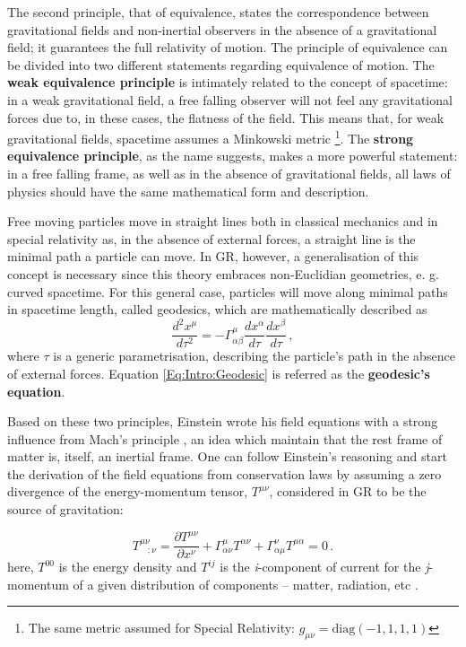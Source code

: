 \qquad The second principle, that of equivalence, states the correspondence between gravitational fields and non-inertial observers in the absence of a gravitational field; it guarantees the full relativity of motion. The principle of equivalence can be divided into two different statements regarding equivalence of motion. The \textbf{weak equivalence principle} is intimately related to the concept of spacetime: in a weak gravitational field, a free falling observer will not feel any gravitational forces due to, in these cases, the flatness of the field. This means that, for weak gravitational fields, spacetime assumes a Minkowski metric \footnote{ The same metric assumed for Special Relativity: $g_{\mu\nu} = \text{diag}(-1,1,1,1)$}. The \textbf{strong equivalence principle}, as the name suggests, makes a more powerful statement: in a free falling frame, as well as in the absence of gravitational fields, all laws of physics should have the same mathematical form and description.

\qquad Free moving particles move in straight lines both in classical mechanics and in special relativity as, in the absence of external forces, a straight line is the minimal path  a particle can move. In GR, however, a generalisation of this concept is necessary since this theory embraces non-Euclidian geometries, e. g. curved spacetime. For this general case, particles will move along minimal paths in spacetime length, called geodesics, which are mathematically described as
\begin{equation}
\frac{d^2x^{\mu}}{d\tau^2} = -\Gamma_{\alpha\beta}^{\mu}\frac{dx^{\alpha}}{d\tau}\frac{dx^{\beta}}{d\tau}\, ,
\label{Eq:Intro:Geodesic}
\end{equation}
where $\tau$ is a generic parametrisation, describing the particle's path in the absence of external forces. Equation \eqref{Eq:Intro:Geodesic} is referred as the \textbf{geodesic's equation}.

\qquad Based on these two principles, Einstein wrote his field equations with a strong influence from Mach's principle \citep{1961BransDickeMach}, an idea which maintain that the rest frame of matter is, itself, an inertial frame. One can follow Einstein's reasoning and start the derivation of the field equations from conservation laws by assuming a zero divergence of the energy-momentum tensor, $T^{\mu\nu}$, considered in GR to be the source of gravitation:

\begin{equation}
T^{\mu\nu}_{\ \ \ \ ;\nu}  = \frac{\partial T^{\mu\nu}}{\partial x^{\nu}} + \Gamma^{\mu}_{\alpha\nu}T^{\alpha\nu} + \Gamma^{\nu}_{\alpha\mu}T^{\mu\alpha}=0 \, .
\label{Eq:Intro:EnergyMomentDiver}
\end{equation}
here, $T^{00}$ is the energy density and $T^{ij}$ is the \textit{i}-component of current for the \textit{j}-momentum of a given distribution of components -- matter, radiation, etc \citep{Peacock,dods,schneider_2016}.

